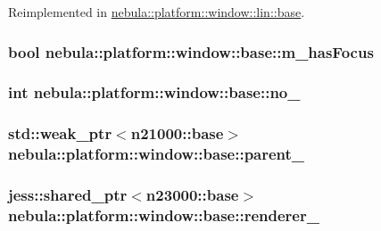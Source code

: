 Reimplemented in \hyperlink{classnebula_1_1platform_1_1window_1_1lin_1_1base_a2d1f7ebc4e8cdbab2553e0ae344af178}{nebula::platform::window::lin::base}.\hypertarget{classnebula_1_1platform_1_1window_1_1base_a642eb7607a4f3c3e86c133a581fe1eb5}{
\subsubsection[{m\_\-hasFocus}]{\setlength{\rightskip}{0pt plus 5cm}bool {\bf nebula::platform::window::base::m\_\-hasFocus}}}
\label{classnebula_1_1platform_1_1window_1_1base_a642eb7607a4f3c3e86c133a581fe1eb5}
\hypertarget{classnebula_1_1platform_1_1window_1_1base_a682d823f868c56aa05bba627b5de7207}{
\subsubsection[{no\_\-}]{\setlength{\rightskip}{0pt plus 5cm}int {\bf nebula::platform::window::base::no\_\-}}}
\label{classnebula_1_1platform_1_1window_1_1base_a682d823f868c56aa05bba627b5de7207}
\hypertarget{classnebula_1_1platform_1_1window_1_1base_a209b92d0223e1c95a75b0c67fc1848e3}{
\subsubsection[{parent\_\-}]{\setlength{\rightskip}{0pt plus 5cm}std::weak\_\-ptr$<${\bf n21000::base}$>$ {\bf nebula::platform::window::base::parent\_\-}}}
\label{classnebula_1_1platform_1_1window_1_1base_a209b92d0223e1c95a75b0c67fc1848e3}
\hypertarget{classnebula_1_1platform_1_1window_1_1base_aadadee1e2f89111165948007fd40986b}{
\subsubsection[{renderer\_\-}]{\setlength{\rightskip}{0pt plus 5cm}jess::shared\_\-ptr$<${\bf n23000::base}$>$ {\bf nebula::platform::window::base::renderer\_\-}}}
